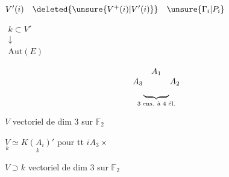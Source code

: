 $V'(i)\quad \deleted{\unsure{V^+(i)|V'(i)}}\quad\unsure{\Gamma_i|P_i}$

$\begin{matrix}k\subset V'\\ \downarrow\\ \mathrm{Aut}(E)\end{matrix}$

\[
 \begin{matrix}&A_1&\\A_3&&A_2\\\multicolumn{3}{c}{\underbrace{\hspace{3em}}_{\text{3 ens. à 4 él.}}}\end{matrix}
\]

$V$ vectoriel de dim 3 sur $\mathbb F_2$ 

$\underset{\scriptscriptstyle k}{V}\simeq\underset{\scriptscriptstyle k}{K(A_i)'}$ pour tt $i$\qquad $A_3\times$

$V\supset k$ vectoriel de dim 3 sur $\mathbb F_2$
